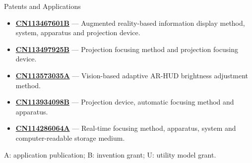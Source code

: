 \documentclass{resume}
\begin{document}
\begin{rSection}{Patents and Applications}
{\begin{itemize}[itemsep=1pt]
\item \href{https://patents.google.com/patent/CN113467601B/zh}{\textbf{CN113467601B}} --- Augmented reality-based information display method, system, apparatus and projection device.
\item \href{https://patents.google.com/patent/CN113497925B/zh}{\textbf{CN113497925B}} --- Projection focusing method and projection focusing device.
\item \href{https://patents.google.com/patent/CN113573035A/zh}{\textbf{CN113573035A}} --- Vision-based adaptive AR-HUD brightness adjustment method.
\item \href{https://patents.google.com/patent/CN113934098B/zh}{\textbf{CN113934098B}} --- Projection device, automatic focusing method and apparatus.
\item \href{https://patents.google.com/patent/CN114286064A/zh}{\textbf{CN114286064A}} --- Real-time focusing method, apparatus, system and computer-readable storage medium.
\end{itemize}
{\fontsize{8.2}{10}\selectfont\color{cvMuted}A: application publication; B: invention grant; U: utility model grant.\par}
}
\end{rSection}
\end{document}
